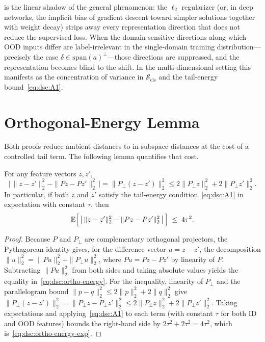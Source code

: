 \begin{remark}
 is the linear shadow of the general phenomenon: the
$\ell_2$ regularizer (or, in deep networks, the implicit bias of gradient
descent toward simpler solutions together with weight decay) strips away every
representation direction that does not reduce the supervised loss. When the
domain-sensitive directions along which OOD inputs differ are label-irrelevant
in the single-domain training distribution---precisely the case
$\delta \in \mathrm{span}(a)^\perp$---those directions are suppressed, and the
representation becomes blind to the shift. In the multi-dimensional setting this
manifests as the concentration of variance in $\mathcal{S}_{\mathrm{cls}}$ and
the tail-energy bound~\eqref{eq:dsc:A1}.
\end{remark}

\section{Orthogonal-Energy Lemma}
\label{sec:dsc-proofs:ortho}

Both proofs reduce ambient distances to in-subspace distances at the cost of a
controlled tail term. The following lemma quantifies that cost.

\begin{lemma}\label{lem:dsc:ortho-energy}
For any feature vectors $z, z'$,
\begin{equation} \bigl|\,\|z - z'\|_2^2 - \|Pz - Pz'\|_2^2\,\bigr| = \|P_\perp(z - z')\|_2^2 \le 2\|P_\perp z\|_2^2 + 2\|P_\perp z'\|_2^2 . \label{eq:dsc:ortho-energy} \end{equation}
In particular, if both $z$ and $z'$ satisfy the tail-energy
condition~\eqref{eq:dsc:A1} in expectation with constant $\tau$, then
\begin{equation} \mathbb{E}\Bigl[\,\bigl|\,\|z - z'\|_2^2 - \|Pz - Pz'\|_2^2\,\bigr|\,\Bigr] \;\le\; 4\tau^2 . \label{eq:dsc:ortho-energy-exp} \end{equation}
\end{lemma}

\begin{proof}
Because $P$ and $P_\perp$ are complementary orthogonal projectors, the
Pythagorean identity gives, for the difference vector $u = z - z'$, the
decomposition $\|u\|_2^2 = \|Pu\|_2^2 + \|P_\perp u\|_2^2$, where
$Pu = Pz - Pz'$ by linearity of $P$. Subtracting $\|Pu\|_2^2$ from both sides
and taking absolute values yields the equality in~\eqref{eq:dsc:ortho-energy}.
For the inequality, linearity of $P_\perp$ and the parallelogram bound
$\|p - q\|_2^2 \le 2\|p\|_2^2 + 2\|q\|_2^2$ give
$\|P_\perp(z - z')\|_2^2 = \|P_\perp z - P_\perp z'\|_2^2 \le 2\|P_\perp z\|_2^2 + 2\|P_\perp z'\|_2^2$.
Taking expectations and applying~\eqref{eq:dsc:A1} to each term (with constant
$\tau$ for both ID and OOD features) bounds the right-hand side by
$2\tau^2 + 2\tau^2 = 4\tau^2$, which is~\eqref{eq:dsc:ortho-energy-exp}.
\end{proof}

